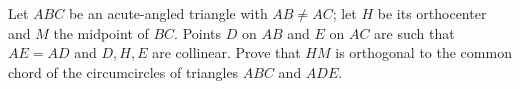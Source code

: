 Let $ABC$ be an acute-angled triangle with $AB \neq AC$; let $H$ be its orthocenter and $M$ the midpoint of $BC$. Points $D$ on $AB$ and $E$ on $AC$ are such that $AE = AD$ and $D, H, E$ are collinear. Prove that $HM$ is orthogonal to the common chord of the circumcircles of triangles $ABC$ and $ADE$.
